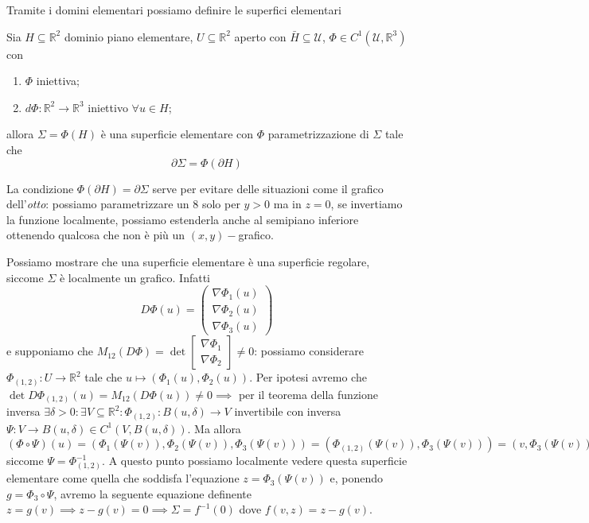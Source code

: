 Tramite i domini elementari possiamo definire le superfici elementari
\begin{definition}[superfici]
	Sia $H \subseteq \mathbb{R}^2$ dominio piano elementare, $U \subseteq \mathbb{R}^2$ aperto con $\bar{H} \subseteq \mathcal{U}$, $\Phi \in C^1(\mathcal{U}, \mathbb{R}^3)$ con
		\begin{enumerate}[label=\protect\circled{\arabic*}]
			\item $\Phi$ iniettiva;
			\item $d\Phi: \mathbb{R}^2 \to \mathbb{R}^3$ iniettivo $\forall u \in H$;
		\end{enumerate}
		allora $\Sigma = \Phi(H)$ è una superficie elementare con $\Phi$ parametrizzazione di $\Sigma$ tale che
		\begin{equation}
			\partial \Sigma = \Phi(\partial H)
			\label{eq:bordo}
		\end{equation}
\end{definition}
\begin{remark}
	La condizione $\Phi(\partial H) = \partial \Sigma$ serve per evitare delle situazioni come il grafico dell'\emph{otto}: possiamo parametrizzare un $8$ solo per $y>0$ ma in $z=0$, se invertiamo la funzione localmente, possiamo estenderla anche al semipiano inferiore ottenendo qualcosa che non è più un $(x, y)-$grafico.
\end{remark}
\begin{remark}
Possiamo mostrare che una superficie elementare è una superficie regolare, siccome $\Sigma$ è localmente un grafico. Infatti
$$
D\Phi(u) = \begin{pmatrix}
\nabla \Phi_1(u) \\
\nabla \Phi_2(u) \\
\nabla \Phi_3(u)
\end{pmatrix}
$$
e supponiamo che $M_{\text{12}}(D\Phi) = \det \begin{bmatrix} \nabla \Phi_1 \\ \nabla \Phi_2 \end{bmatrix} \neq 0$: possiamo considerare $\Phi_{(1, 2)}: U \to \mathbb{R}^2$ tale che $u \mapsto (\Phi_1(u), \Phi_2(u))$. Per ipotesi avremo che $\det D\Phi_{(1, 2)}(u) = M_{12}(D\Phi(u)) \neq 0 \implies$ per il teorema della funzione inversa $\exists \delta > 0: \exists V \subseteq \mathbb{R}^2: \Phi_{(1,2)}: B(u, \delta) \to V$ invertibile con inversa $\Psi: V \to B(u, \delta) \in C^1(V, B(u, \delta))$.
Ma allora $(\Phi \circ \Psi)(u) = (\Phi_1(\Psi(v)), \Phi_2(\Psi(v)), \Phi_3(\Psi(v))) = (\Phi_{(1,2)}(\Psi(v)), \Phi_3(\Psi(v))) = (v, \Phi_3(\Psi(v)))$ siccome $\Psi = \Phi_{(1,2)}^{-1}$. A questo punto possiamo localmente vedere questa superficie elementare come quella che soddisfa l'equazione $z = \Phi_3(\Psi(v))$ e, ponendo $g = \Phi_3 \circ \Psi$, avremo la seguente equazione definente $z=g(v) \implies z - g(v) = 0 \implies \Sigma=f^{-1}(0)$ dove $f(v, z) = z - g(v)$. \\

\end{remark}
\newpage 
\newpage 
\newpage
